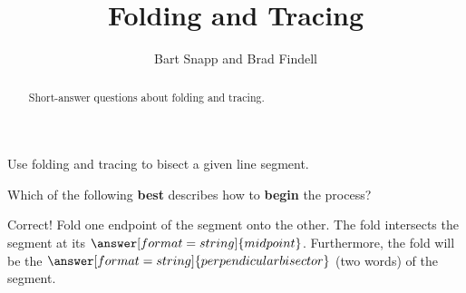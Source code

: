 \documentclass[nooutcomes]{ximera}
\title{Folding and Tracing}
\author{Bart Snapp and Brad Findell}
\begin{document}
\begin{abstract}
Short-answer questions about folding and tracing. 
\end{abstract}
\maketitle

%


\begin{problem}
Use folding and tracing to bisect a given line segment. 
\begin{image}
\end{image}
Which of the following \textbf{best} describes how to \textbf{begin} the process?  
\begin{multipleChoice}
\end{multipleChoice}
\begin{problem}
Correct!  Fold one endpoint of the segment onto the other.  The fold intersects the segment at its $\answer[format=string]{midpoint}$.  
Furthermore, the fold will be the $\answer[format=string]{perpendicular bisector}$ (two words) of the segment.  
\end{problem}
\end{problem}
\end{document}
